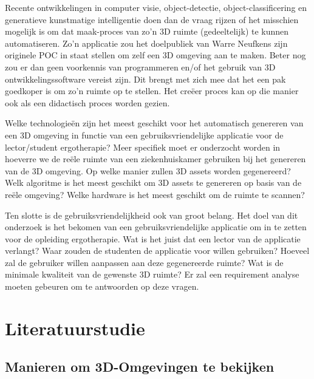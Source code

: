 \documentclass{hogent-article}
\begin{document}
Recente ontwikkelingen in computer visie, object-detectie, object-classificering en generatieve kunstmatige  intelligentie doen dan de vraag rijzen of het misschien mogelijk is om dat maak-proces van zo’n 3D ruimte (gedeeltelijk) te kunnen automatiseren. Zo’n applicatie zou het doelpubliek van Warre Neufkens zijn originele POC in staat stellen om zelf een 3D omgeving aan te maken. Beter nog zou er dan geen voorkennis van programmeren en/of het gebruik van 3D ontwikkelingssoftware vereist zijn. Dit brengt met zich mee dat het een pak goedkoper is om zo’n ruimte op te stellen. Het creëer proces kan op die manier ook als een didactisch proces worden gezien. 

Welke technologieën zijn het meest geschikt voor het automatisch genereren van een 3D omgeving in functie van een gebruiksvriendelijke applicatie voor de lector/student ergotherapie?
Meer specifiek moet er onderzocht worden in hoeverre we de reële ruimte van een ziekenhuiskamer gebruiken bij het genereren van de 3D omgeving. Op welke manier zullen 3D assets worden gegenereerd? Welk algoritme is het meest geschikt om 3D assets te genereren op basis van de reële omgeving? Welke hardware is het meest geschikt om de ruimte te scannen? 

Ten slotte is de gebruiksvriendelijkheid ook van groot belang. Het doel van dit onderzoek is het bekomen van een gebruiksvriendelijke applicatie om in te zetten voor de opleiding ergotherapie. 
Wat is het juist dat een lector van de applicatie verlangt? Waar zouden de studenten de applicatie voor willen gebruiken? Hoeveel zal de gebruiker willen aanpassen aan deze gegenereerde ruimte? Wat is de minimale kwaliteit van de gewenste 3D ruimte?  Er zal een requirement analyse moeten gebeuren om te antwoorden op deze vragen.



\section{Literatuurstudie}%
\label{sec:literatuurstudie}



\subsection{Manieren om 3D-Omgevingen te bekijken}
\end{document}
